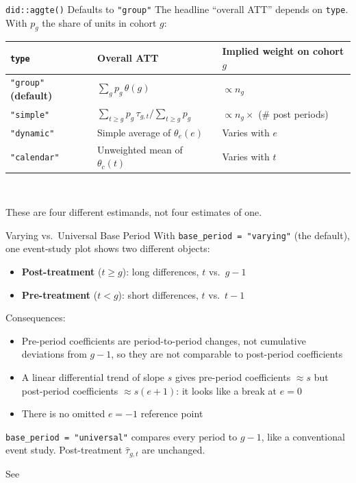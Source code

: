 \documentclass[11pt]{beamer}
\begin{document}
\begin{frame}[fragile]{\texttt{did::aggte()} Defaults to \texttt{"group"}}
\footnotesize
The headline ``overall ATT'' depends on \verb|type|. With $p_g$ the share of units in cohort $g$:

\vspace{0.4em}
\setlength{\tabcolsep}{3pt}
\begin{tabular}{L{1.9cm} L{4cm} L{3cm}}
\toprule
\verb|type| & Overall ATT & Implied weight on cohort $g$ \\
\midrule
\verb|"group"| \textbf{(default)} & $\sum_g p_g\,\theta(g)$ & $\propto n_g$ \\
\verb|"simple"| & $\sum_{t\ge g} p_g\,\tau_{g,t} \big/ \sum_{t\ge g} p_g$ & $\propto n_g \times$ (\# post periods) \\
\verb|"dynamic"| & Simple average of $\theta_e(e)$ & Varies with $e$ \\
\verb|"calendar"| & Unweighted mean of $\theta_c(t)$ & Varies with $t$ \\
\bottomrule
\end{tabular}
\\[0.2em]

\vspace{0.6em}

These are four different estimands, not four estimates of one.
\end{frame}

\begin{frame}{Varying vs.\ Universal Base Period}
With \texttt{base\_period = "varying"} (the default), one event-study plot shows two different objects:
\begin{itemize}
  \item \textbf{Post-treatment} ($t \ge g$): long differences, $t$ vs.\ $g-1$
  \item \textbf{Pre-treatment} ($t < g$): short differences, $t$ vs.\ $t-1$
\end{itemize}

\vspace{0.3em}
Consequences:
\begin{itemize}
  \item Pre-period coefficients are period-to-period changes, not cumulative deviations
        from $g-1$, so they are not comparable to post-period coefficients
  \item A linear differential trend of slope $s$ gives pre-period coefficients $\approx s$
        but post-period coefficients $\approx s(e+1)$: it looks like a break at $e=0$
  \item There is no omitted $e=-1$ reference point
\end{itemize}

\vspace{0.3em}
\texttt{base\_period = "universal"} compares every period to $g-1$, like a conventional
event study. Post-treatment $\hat\tau_{g,t}$ are unchanged.

\vspace{0.2em}
\scriptsize See \textcite{roth2026interpreting}
\end{frame}
\end{document}
